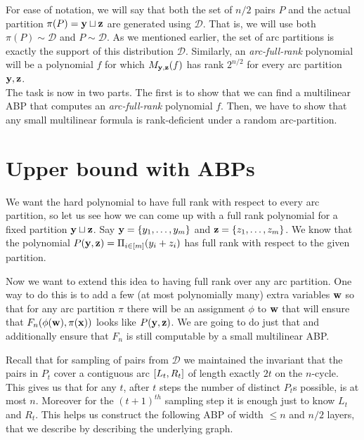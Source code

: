 For ease of notation, we will say that both the set of $n/2$ pairs $P$ and the actual partition $\pi(P)=\mathbf{y} \sqcup \mathbf{z}$ are generated using $\mathcal{D}$.
That is, we will use both $\pi(P) \sim \mathcal{D}$ and $P \sim \mathcal{D}$.
As we mentioned earlier, the set of arc partitions is exactly the support of this distribution $\mathcal{D}$.
Similarly, an \emph{arc-full-rank} polynomial will be a polynomial $f$ for which $M_{\mathbf{y},\mathbf{z}}(f)$ has rank $2^{n/2}$ for every arc partition $\mathbf{y},\mathbf{z}$.\\

The task is now in two parts.
The first is to show that we can find a multilinear ABP that computes an \emph{arc-full-rank} polynomial $f$.
Then, we have to show that any small multilinear formula is rank-deficient under a random arc-partition.

\section{Upper bound with ABPs}

We want the hard polynomial to have full rank with respect to every arc partition, so let us see how we can come up with a full rank polynomial for a fixed partition $\mathbf{y} \sqcup \mathbf{z}$.
Say $\mathbf{y} = \left\{y_1,\ldots,y_m\right\}$ and $\mathbf{z} = \left\{z_1,\ldots,z_m\right\}$.
We know that the polynomial $P(\mathbf{y},\mathbf{z}) = \Pi_{i \in [m]} (y_i + z_i)$ has full rank with respect to the given partition.

Now we want to extend this idea to having full rank over any arc partition.
One way to do this is to add a few (at most polynomially many) extra variables $\mathbf{w}$ so that for any arc partition $\pi$ there will be an assignment $\phi$ to $\mathbf{w}$ that will ensure that $F_n(\phi(\mathbf{w}),\pi(\mathbf{x}))$ looks like $P(\mathbf{y},\mathbf{z})$.
We are going to do just that and additionally ensure that $F_n$ is still computable by a small multilinear ABP.

Recall that for sampling of pairs from $\mathcal{D}$ we maintained the invariant that the pairs in $P_t$ cover a contiguous arc $\left[L_t, R_t\right]$ of length exactly $2t$ on the $n$-cycle.
This gives us that for any $t$, after $t$ steps the number of distinct $P_t$s possible, is at most $n$.
Moreover for the $(t+1)^{th}$ sampling step it is enough just to know $L_t$ and $R_t$.
This helps us construct the following ABP of width $\leq n$ and $n/2$ layers, that we describe by describing the underlying graph.\\

